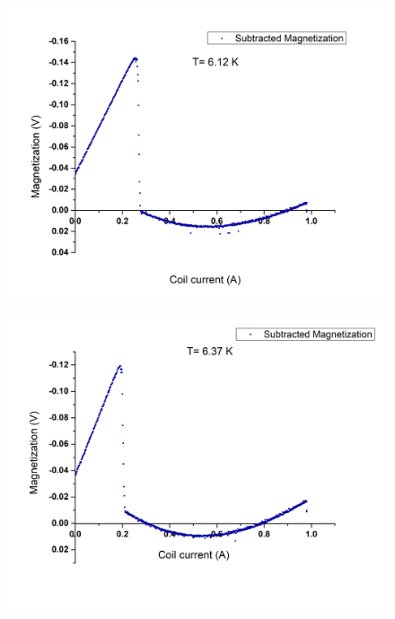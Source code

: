 \documentclass[openany,11pt,a4paper]{report}
\begin{document}
\begin{figure}[H]
\begin{center}
\includegraphics[scale=0.45]{612.jpg} 
\end{center}
\end{figure}



\begin{figure}[H]
\begin{center}
\includegraphics[scale=0.5]{637.jpg} 
\end{center}
\end{figure}
\end{document}
